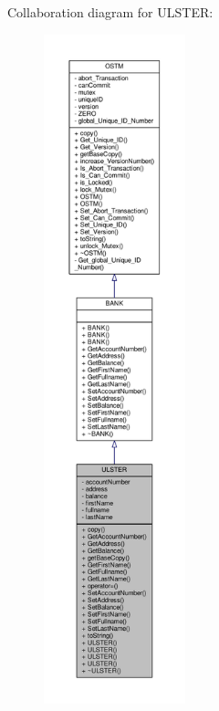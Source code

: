 Collaboration diagram for U\+L\+S\+T\+ER\+:
\nopagebreak
\begin{figure}[H]
\begin{center}
\leavevmode
\includegraphics[height=550pt]{class_u_l_s_t_e_r__coll__graph}
\end{center}
\end{figure}

